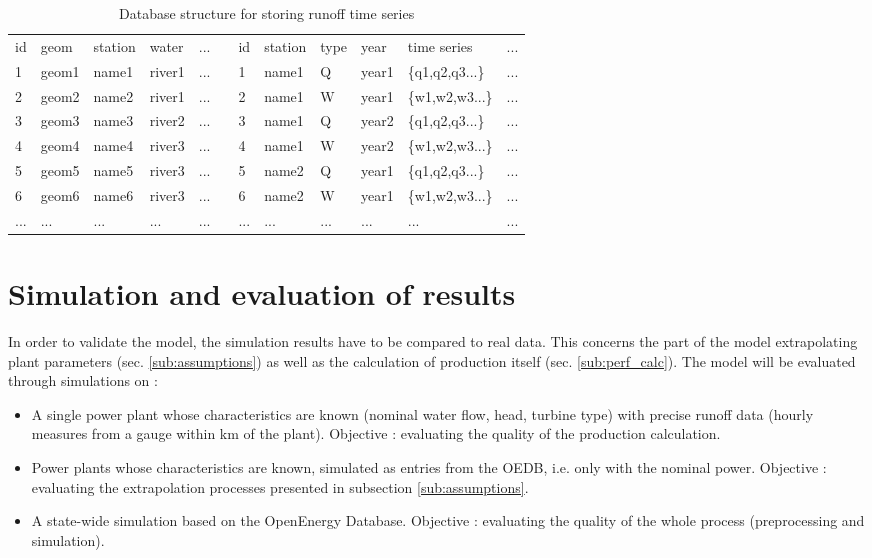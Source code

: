 \begin{table}[H]
\footnotesize
  \centering
  \caption{Database structure for storing runoff time series}
  \label{db_struct}
  \begin{tabular}{|l|l|l|l|ll|l|l|l|l|l|l}
  \cline{1-5}\cline{7-12}
  id & geom &station & water & ...&& id & station & type & year & time series & ...\\
  \cline{1-5}\cline{7-12}
  1&geom1&name1&river1&...&&1&name1&Q&year1&\{q1,q2,q3...\}&...\\\cline{1-5}\cline{7-12}
  2&geom2&name2&river1&...&&2&name1&W&year1&\{w1,w2,w3...\}&...\\\cline{1-5}\cline{7-12}
  3&geom3&name3&river2&...&&3&name1&Q&year2&\{q1,q2,q3...\}&...\\\cline{1-5}\cline{7-12}
  4&geom4&name4&river3&...&&4&name1&W&year2&\{w1,w2,w3...\}&...\\\cline{1-5}\cline{7-12}
  5&geom5&name5&river3&...&&5&name2&Q&year1&\{q1,q2,q3...\}&...\\\cline{1-5}\cline{7-12}
  6&geom6&name6&river3&...&&6&name2&W&year1&\{w1,w2,w3...\}&...\\\cline{1-5}\cline{7-12}
  ...&...&...&...&...&&...&...&...&...&...&...\\
  \end{tabular}
\end{table}


\section{Simulation and evaluation of results}

\label{sec:simu_res}

In order to validate the model, the simulation results have to be compared to real data. This concerns the part of the model extrapolating plant parameters (sec. \ref{sub:assumptions}) as well as the calculation of production itself (sec. \ref{sub:perf_calc}). \newline
The model will be evaluated through simulations on :
\begin{itemize}
 \item A single power plant whose characteristics are known (nominal water flow, head, turbine type) with precise runoff data (hourly measures from a gauge within \unit[2]{km} of the plant). Objective : evaluating the quality of the production calculation.
 \item Power plants whose characteristics are known, simulated as entries from the OEDB, i.e. only with the nominal power. Objective : evaluating the extrapolation processes presented in subsection \ref{sub:assumptions}.
 \item A state-wide simulation based on the OpenEnergy Database. Objective : evaluating the quality of the whole process (preprocessing and simulation).
\end{itemize}

